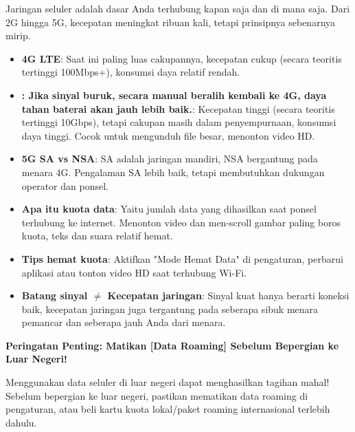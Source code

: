 
Jaringan seluler adalah dasar Anda terhubung kapan saja dan di mana saja. Dari 2G hingga 5G, kecepatan meningkat ribuan kali, tetapi prinsipnya sebenarnya mirip.


\begin{itemize}
  \item \textbf{4G LTE}: Saat ini paling luas cakupannya, kecepatan cukup (secara teoritis tertinggi 100Mbps+), konsumsi daya relatif rendah.
  \item \textbf{: Jika sinyal buruk, secara manual beralih kembali ke 4G, daya tahan baterai akan jauh lebih baik.}: Kecepatan tinggi (secara teoritis tertinggi 10Gbps), tetapi cakupan masih dalam penyempurnaan, konsumsi daya tinggi. Cocok untuk mengunduh file besar, menonton video HD.
  \item \textbf{5G SA vs NSA}: SA adalah jaringan mandiri, NSA bergantung pada menara 4G. Pengalaman SA lebih baik, tetapi membutuhkan dukungan operator dan ponsel.
\end{itemize}


\begin{itemize}
  \item \textbf{Apa itu kuota data}: Yaitu jumlah data yang dihasilkan saat ponsel terhubung ke internet. Menonton video dan men-scroll gambar paling boros kuota, teks dan suara relatif hemat.
  \item \textbf{Tips hemat kuota}: Aktifkan "Mode Hemat Data" di pengaturan, perbarui aplikasi atau tonton video HD saat terhubung Wi-Fi.
  \item \textbf{Batang sinyal $\neq$ Kecepatan jaringan}: Sinyal kuat hanya berarti koneksi baik, kecepatan jaringan juga tergantung pada seberapa sibuk menara pemancar dan seberapa jauh Anda dari menara.
\end{itemize}

\textbf{Peringatan Penting: Matikan [Data Roaming] Sebelum Bepergian ke Luar Negeri!}\par

Menggunakan data seluler di luar negeri dapat menghasilkan tagihan mahal! Sebelum bepergian ke luar negeri, pastikan mematikan data roaming di pengaturan, atau beli kartu kuota lokal/paket roaming internasional terlebih dahulu.



